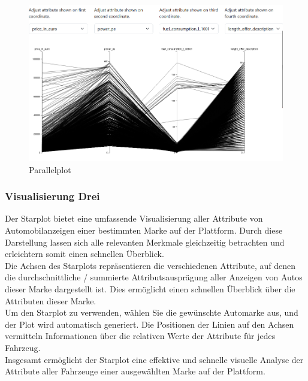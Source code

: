 \begin{figure}[H]
    \centering
    \includegraphics[width = \textwidth]{img/parallelplot.png}
    \caption{Parallelplot}
    \label{fig:scatter}
\end{figure}


\subsubsection{Visualisierung Drei}

Der Starplot bietet eine umfassende Visualisierung aller Attribute von Automobilanzeigen einer bestimmten Marke auf der Plattform. Durch diese Darstellung lassen sich alle relevanten Merkmale gleichzeitig betrachten und erleichtern somit einen schnellen Überblick. \\
Die Achsen des Starplots repräsentieren die verschiedenen Attribute, auf denen die durchschnittliche / summierte Attributsausprägung aller Anzeigen von Autos dieser Marke dargestellt ist. Dies ermöglicht einen schnellen Überblick über die Attributen dieser Marke. \\
Um den Starplot zu verwenden, wählen Sie die gewünschte Automarke aus, und der Plot wird automatisch generiert. Die Positionen der Linien auf den Achsen vermitteln Informationen über die relativen Werte der Attribute für jedes Fahrzeug. \\
Insgesamt ermöglicht der Starplot eine effektive und schnelle visuelle Analyse der Attribute aller Fahrzeuge einer ausgewählten Marke auf der Plattform. \\

